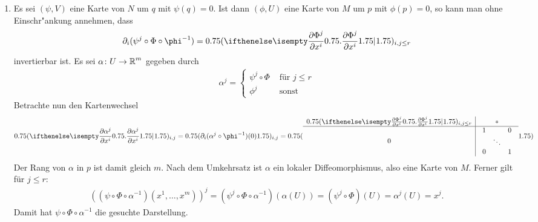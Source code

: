 
\begin{bew} %
\begin{enumerate}[label=(\roman*),widest=ii,leftmargin=*]
  \item
  Es sei $(\psi, V)$ eine Karte von $N$ um $q$ mit $\psi(q) = 0$.
  Ist dann $(\phi, U)$ eine Karte von $M$ um $p$ mit $\phi(p) = 0$, so kann man ohne Einschr"ankung annehmen, dass 
  \begin{align*}
    \partial_i(\psi^j \circ \Phi \circ \phi^{-1}) = \left(\pdifffrac{\Phi^j}{x^i}\right)_{i,j \leq r} 
  \end{align*}
  invertierbar ist.
  Es sei $\alpha \colon U \to \operatorname{\mathbb{R}}^m$ gegeben durch
  \begin{align*}
    \alpha^j =
    \begin{cases}
      \psi^j \circ \Phi & \text{ für } j \leq r\\
      \phi^j & \text{ sonst}
    \end{cases}
  \end{align*}
  Betrachte nun den Kartenwechsel
  \begin{align*}
    \left(\pdifffrac{\alpha^j}{x^i}\right)_{i,j} = \left(\partial_i(\alpha^j \circ \phi^{-1})(0)\right)_{i,j} = \left(
      \begin{array}{c|c}
        \left(\pdifffrac{\Phi^j}{x^i}\right)_{i,j \le r} & \ast\\
        \hline
        0 & 
        \begin{array}{ccc}
          1 &&0\\
          &\ddots&\\
          0&&1
        \end{array}
      \end{array}\right)
  \end{align*}
  Der Rang von $\alpha$ in $p$ ist damit gleich $m$. Nach dem Umkehrsatz ist $\alpha$ ein lokaler Diffeomorphismus, also eine Karte von $M$. Ferner gilt für $j \leq r$:
  \begin{align*}
    \left((\psi \circ \Phi \circ \alpha^{-1})(x^1,\ldots,x^m)\right)^j = (\psi^j \circ \Phi \circ \alpha^{-1})(\alpha(U)) = (\psi^j\circ \Phi)(U) = \alpha^j(U) = x^j.
  \end{align*}
  Damit hat $\psi \circ \Phi \circ \alpha^{-1}$ die gesuchte Darstellung.


\end{enumerate}
\end{bew}
